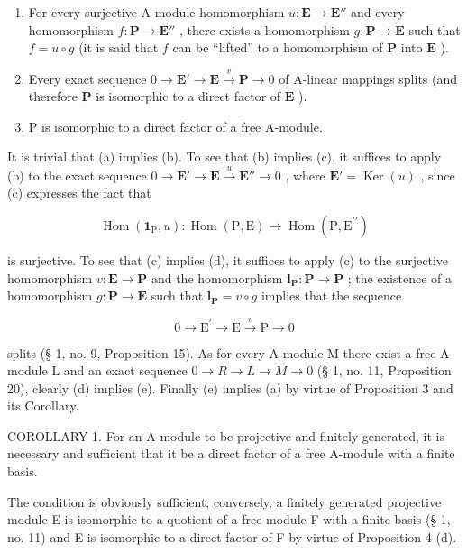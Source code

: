 \begin{enumerate}
\def\labelenumi{(\alph{enumi})}
\setcounter{enumi}{2}
\item
  For every surjective A-module homomorphism \(u: \mathbf{E} \to \mathbf{E}''\) and every homomorphism \(f: \mathbf{P} \to \mathbf{E}''\) , there exists a homomorphism \(g: \mathbf{P} \to \mathbf{E}\) such that \(f = u \circ g\) (it is said that \(f\) can be ``lifted'' to a homomorphism of \(\mathbf{P}\) into \(\mathbf{E}\) ).
\item
  Every exact sequence \(0 \to \mathbf{E}' \to \mathbf{E} \xrightarrow{v} \mathbf{P} \to 0\) of A-linear mappings splits (and therefore \(\mathbf{P}\) is isomorphic to a direct factor of \(\mathbf{E}\) ).
\item
  P is isomorphic to a direct factor of a free A-module.
\end{enumerate}

It is trivial that (a) implies (b). To see that (b) implies (c), it suffices to apply (b) to the exact sequence \(0 \to \mathbf{E}' \to \mathbf{E} \xrightarrow{u} \mathbf{E}'' \to 0\) , where \(\mathbf{E}' = \operatorname{Ker}(u)\) , since (c) expresses the fact that

\[
\operatorname{Hom} \left(\mathbf {1} _ {\mathrm{P}}, u\right): \operatorname{Hom} (\mathrm{P}, \mathrm{E}) \rightarrow \operatorname{Hom} (\mathrm{P}, \mathrm{E} ^ {\prime \prime})
\]

is surjective. To see that (c) implies (d), it suffices to apply (c) to the surjective homomorphism \(v: \mathbf{E} \to \mathbf{P}\) and the homomorphism \(\mathbf{l}_{\mathbf{P}}: \mathbf{P} \to \mathbf{P}\) ; the existence of a homomorphism \(g: \mathbf{P} \to \mathbf{E}\) such that \(\mathbf{l}_{\mathbf{P}} = v \circ g\) implies that the sequence

\[
0 \longrightarrow \mathrm{E} ^ {\prime} \longrightarrow \mathrm{E} \stackrel {v} {\longrightarrow} \mathrm{P} \longrightarrow 0
\]

splits (§ 1, no. 9, Proposition 15). As for every A-module M there exist a free A-module L and an exact sequence \(0 \to R \to L \to M \to 0\) (§ 1, no. 11, Proposition 20), clearly (d) implies (e). Finally (e) implies (a) by virtue of Proposition 3 and its Corollary.

COROLLARY 1. For an A-module to be projective and finitely generated, it is necessary and sufficient that it be a direct factor of a free A-module with a finite basis.

The condition is obviously sufficient; conversely, a finitely generated projective module E is isomorphic to a quotient of a free module F with a finite basis (§ 1, no. 11) and E is isomorphic to a direct factor of F by virtue of Proposition 4 (d).

